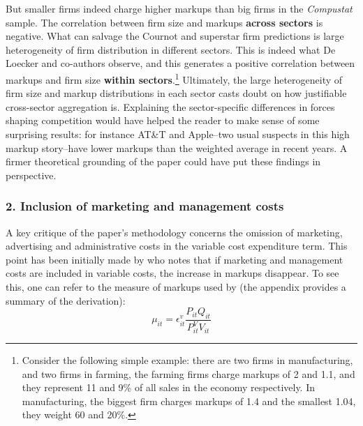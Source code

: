 \documentclass{amsart}
\theoremstyle{definition}
\theoremstyle{remark}
\numberwithin{equation}{section}
\begin{document}
But smaller firms indeed charge higher markups than big firms in the \textit{Compustat} sample. The correlation between firm size and markups \textbf{across sectors} is negative. What can salvage the Cournot and superstar firm predictions is large heterogeneity of firm distribution in different sectors. This is indeed what De Loecker and co-authors observe, and this generates a positive correlation between markups and firm size \textbf{within sectors}.\footnote{Consider the following simple example: there are two firms in manufacturing, and two firms in farming, the farming firms charge markups of 2 and 1.1, and they represent 11 and 9\% of all sales in the economy respectively. In manufacturing, the biggest firm charges markups of 1.4 and the smallest 1.04, they weight 60 and 20\%.} Ultimately, the large heterogeneity of firm size and markup distributions in each sector casts doubt on how justifiable cross-sector aggregation is. Explaining the sector-specific differences in forces shaping competition would have helped the reader to make sense of some surprising results: for instance AT\&T and Apple--two usual suspects in this high markup story--have lower markups than the weighted average in recent years. A firmer theoretical grounding of the paper could have put these findings in perspective.\\




\subsubsection*{2. Inclusion of marketing and management costs} A key critique of the paper's methodology concerns the omission of marketing, advertising and administrative costs in the variable cost expenditure term. This point has been initially made by \cite{traina2018aggregate} who notes that if marketing and management costs are included in variable costs, the increase in markups disappear. To see this, one can refer to the measure of markups used by \cite{de2019rise} (the appendix provides a summary of the derivation):
$$\mu_{i t}=\epsilon_{i t}^v \frac{P_{i t} Q_{i t}}{P_{i t}^{V} V_{i t}}$$
\end{document}

